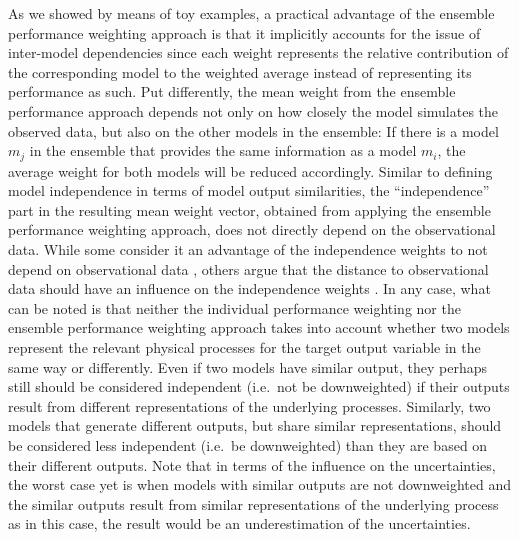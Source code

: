 As we showed by means of toy examples, a practical advantage of the ensemble performance weighting approach is that it implicitly accounts for the issue of inter-model dependencies since each weight represents the relative contribution of the corresponding model to the weighted average instead of representing its performance as such. Put differently, the mean weight from the ensemble performance approach depends not only on how closely the model simulates the observed data, but also on the other models in the ensemble: If there is a model $m_j$ in the ensemble that provides the same information as a model $m_i$, the average weight for both models will be reduced accordingly. Similar to defining model independence in terms of model output similarities, the “independence” part in the resulting mean weight vector, obtained from applying the ensemble performance weighting approach, does not directly depend on the observational data. While some consider it an advantage of the independence weights to not depend on observational data \citep[e.g.][]{brunnerReducedGlobalWarming2020}, others argue that the distance to observational data should have an influence on the independence weights \citep[e.g.][]{abramowitzESDReviewsModel2019}. In any case, what can be noted is that neither the individual performance weighting nor the ensemble performance weighting approach takes into account whether two models represent the relevant physical processes for the target output variable in the same way or differently. Even if two models have similar output, they perhaps still should be considered independent (i.e.~not be downweighted) if their outputs result from different representations of the underlying processes. Similarly, two models that generate different outputs, but share similar representations, should be considered less independent (i.e.~be downweighted) than they are based on their different outputs. Note that in terms of the influence on the uncertainties, the worst case yet is when models with similar outputs are not downweighted and the similar outputs result from similar representations of the underlying process as in this case, the result would be an underestimation of the uncertainties.

